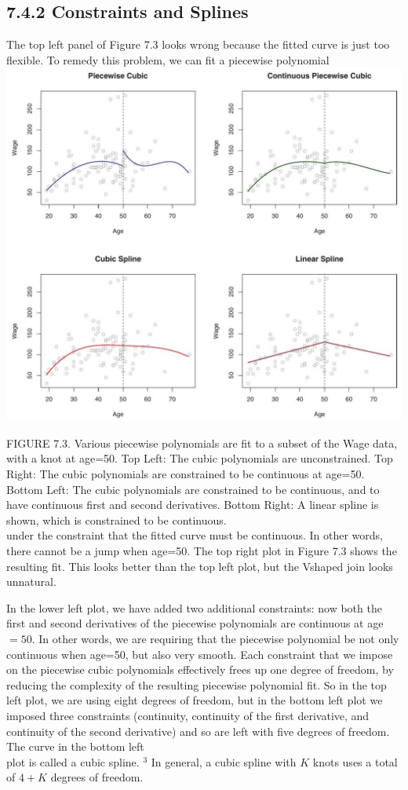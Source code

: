 \documentclass[10pt]{article}
\begin{document}
\subsection*{7.4.2 Constraints and Splines}
The top left panel of Figure 7.3 looks wrong because the fitted curve is just too flexible. To remedy this problem, we can fit a piecewise polynomial\\
\includegraphics[max width=\textwidth, center]{2025_05_05_efe77898333945044de4g-287}

FIGURE 7.3. Various piecewise polynomials are fit to a subset of the Wage data, with a knot at age=50. Top Left: The cubic polynomials are unconstrained. Top Right: The cubic polynomials are constrained to be continuous at age=50. Bottom Left: The cubic polynomials are constrained to be continuous, and to have continuous first and second derivatives. Bottom Right: A linear spline is shown, which is constrained to be continuous.\\
under the constraint that the fitted curve must be continuous. In other words, there cannot be a jump when age=50. The top right plot in Figure 7.3 shows the resulting fit. This looks better than the top left plot, but the Vshaped join looks unnatural.

In the lower left plot, we have added two additional constraints: now both the first and second derivatives of the piecewise polynomials are continuous at age $=50$. In other words, we are requiring that the piecewise polynomial be not only continuous when age=50, but also very smooth. Each constraint that we impose on the piecewise cubic polynomials effectively frees up one degree of freedom, by reducing the complexity of the resulting piecewise polynomial fit. So in the top left plot, we are using eight degrees of freedom, but in the bottom left plot we imposed three constraints (continuity, continuity of the first derivative, and continuity of the second derivative) and so are left with five degrees of freedom. The curve in the bottom left\\
plot is called a cubic spline. ${ }^{3}$ In general, a cubic spline with $K$ knots uses a total of $4+K$ degrees of freedom.
\end{document}
